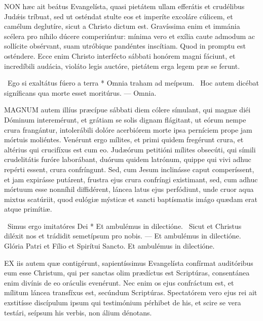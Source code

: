 

\lettrine[lines=2]{N}{ON} hæc ait beátus Evangelísta, quasi pietátem ullam efferátis et crudélibus Judǽis tríbuat, sed ut osténdat stulte eos et imperíte excoláre cúlicem, et camélum deglutíre, sicut a Christo dictum est. Gravíssima enim et immánia scélera pro níhilo dúcere comperiúntur: mínima vero et exília caute admodum ac sollícite obsérvant, suam utróbique pandéntes inscítiam. Quod in promptu est osténdere. Ecce enim Christo interfécto sábbati honórem magni fáciunt, et incredíbili audácia, violáto legis auctóre, pietátem erga legem præ se ferunt.

\R\ Ego si exaltátus fúero a terra * Omnia traham ad meípsum. \V\ Hoc autem dicébat signíficans qua morte esset moritúrus. --- Omnia.


\lettrine[lines=2]{M}{AGNUM} autem illíus præcípue sábbati diem cólere símulant, qui magnæ diéi Dóminum interemérunt, et grátiam se solis dignam flágitant, ut eórum nempe crura frangántur, intolerábili dolóre acerbiórem morte ipsa perníciem prope jam mórtuis moliéntes. Venérunt ergo mílites, et primi quidem fregérunt crura, et altérius qui crucifíxus est cum eo. Judæórum petitióni mílites obsecúti, qui símili crudelitátis furóre laborábant, duórum quidem latrónum, quippe qui vivi adhuc repérti essent, crura confríngunt. Sed, cum Jesum inclinásse caput comperíssent, et jam expirásse putárent, frustra ejus crura confríngi existimant, sed, cum adhuc mórtuum esse nonníhil diffidérent, láncea latus ejus perfódiunt, unde cruor aqua mixtus scatúriit, quod eulógiæ mýsticæ et sancti baptísmatis imágo quædam erat atque primítiæ.

\R\ Simus ergo imitatóres Dei * Et ambulémus in dilectióne. \V\ Sicut et Christus diléxit nos et trádidit semetípsum pro nobis. --- Et ambulémus in dilectióne. Glória Patri et Fílio et Spirítui Sancto. Et ambulémus in dilectióne.


\lettrine[lines=2]{E}{X} iis autem quæ contigérunt, sapientíssimus Evangelísta confírmat auditóribus eum esse Christum, qui per sanctas olim prædíctus est Scriptúras, consentánea enim divínis de eo oráculis evenérunt. Nec enim os ejus confráctum est, et mílitum láncea transfíxus est, secúndum Scriptúras. Spectatórem vero ejus rei ait exstitísse discípulum ipsum qui testimónium pérhibet de his, et scire se vera testári, seípsum his verbis, non álium dénotans.

